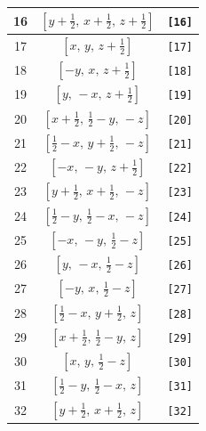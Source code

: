 \documentclass[fleqn,8pt]{jsarticle}
\begin{document}
\begin{longtable}{ccc}
16 & $\left[ y + \frac{1}{2},\, x + \frac{1}{2},\, z + \frac{1}{2} \right]$ & {\tt [16]} \\ \hline
17 & $\left[ x,\, y,\, z + \frac{1}{2} \right]$ & {\tt [17]} \\ \hline
18 & $\left[ - y,\, x,\, z + \frac{1}{2} \right]$ & {\tt [18]} \\ \hline
19 & $\left[ y,\, - x,\, z + \frac{1}{2} \right]$ & {\tt [19]} \\ \hline
20 & $\left[ x + \frac{1}{2},\, \frac{1}{2} - y,\, - z \right]$ & {\tt [20]} \\ \hline
21 & $\left[ \frac{1}{2} - x,\, y + \frac{1}{2},\, - z \right]$ & {\tt [21]} \\ \hline
22 & $\left[ - x,\, - y,\, z + \frac{1}{2} \right]$ & {\tt [22]} \\ \hline
23 & $\left[ y + \frac{1}{2},\, x + \frac{1}{2},\, - z \right]$ & {\tt [23]} \\ \hline
24 & $\left[ \frac{1}{2} - y,\, \frac{1}{2} - x,\, - z \right]$ & {\tt [24]} \\ \hline
25 & $\left[ - x,\, - y,\, \frac{1}{2} - z \right]$ & {\tt [25]} \\ \hline
26 & $\left[ y,\, - x,\, \frac{1}{2} - z \right]$ & {\tt [26]} \\ \hline
27 & $\left[ - y,\, x,\, \frac{1}{2} - z \right]$ & {\tt [27]} \\ \hline
28 & $\left[ \frac{1}{2} - x,\, y + \frac{1}{2},\, z \right]$ & {\tt [28]} \\ \hline
29 & $\left[ x + \frac{1}{2},\, \frac{1}{2} - y,\, z \right]$ & {\tt [29]} \\ \hline
30 & $\left[ x,\, y,\, \frac{1}{2} - z \right]$ & {\tt [30]} \\ \hline
31 & $\left[ \frac{1}{2} - y,\, \frac{1}{2} - x,\, z \right]$ & {\tt [31]} \\ \hline
32 & $\left[ y + \frac{1}{2},\, x + \frac{1}{2},\, z \right]$ & {\tt [32]} \\
\end{longtable}
\end{document}
